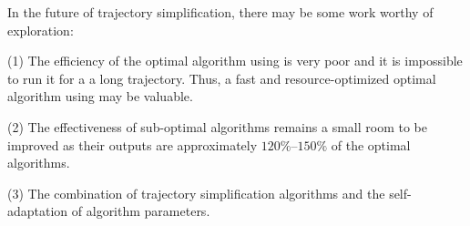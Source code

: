 In the future of trajectory simplification, there may be some work worthy of exploration:

(1) The efficiency of the optimal algorithm using \sed is very poor and it is impossible to run it for a a long trajectory. Thus, a fast and resource-optimized optimal algorithm using \sed may be valuable.

(2) The effectiveness of sub-optimal algorithms remains a small room to be improved as their outputs are approximately $120\%$--$150\%$ of the optimal algorithms.

(3) The combination of trajectory simplification algorithms and the self-adaptation of algorithm parameters.

